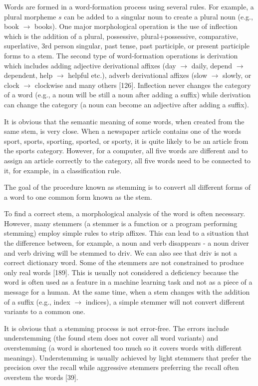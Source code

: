 \documentclass[11pt,openany,executivepaper]{book}
\begin{document}
Words are formed in a word-formation process using several rules. For example, a plural morpheme $s$ can be added to a singular noun to create a plural noun (e.g., book $\rightarrow$ books). One major morphological operation is the use of inflection which is the addition of a plural, possessive, plural+possessive, comparative, superlative, 3rd person singular, past tense, past participle, or present participle forms to a stem. The second type of word-formation operations is derivation which includes adding adjective derivational affixes (day $\rightarrow$ daily, depend $\rightarrow$ dependent, help $\rightarrow$ helpful etc.), adverb derivational affixes (slow $\rightarrow$ slowly, or clock $\rightarrow$ clockwise and many others [126]. Inflection never changes the category of a word (e.g., a noun will be still a noun after adding a suffix) while derivation can change the category (a noun can become an adjective after adding a suffix).

It is obvious that the semantic meaning of some words, when created from the same stem, is very close. When a newspaper article contains one of the words sport, sports, sporting, sported, or sporty, it is quite likely to be an article from the sports category. However, for a computer, all five words are different and to assign an article correctly to the category, all five words need to be connected to it, for example, in a classification rule.

The goal of the procedure known as stemming is to convert all different forms of a word to one common form known as the stem.

To find a correct stem, a morphological analysis of the word is often necessary. However, many stemmers (a stemmer is a function or a program performing stemming) employ simple rules to strip affixes. This can lead to a situation that the difference between, for example, a noun and verb disappears - a noun driver and verb driving will be stemmed to driv. We can also see that driv is not a correct dictionary word. Some of the stemmers are not constrained to produce only real words [189]. This is usually not considered a deficiency because the word is often used as a feature in a machine learning task and not as a piece of a message for a human. At the same time, when a stem changes with the addition of a suffix (e.g., index $\rightarrow$ indices), a simple stemmer will not convert different variants to a common one.

It is obvious that a stemming process is not error-free. The errors include understemming (the found stem does not cover all word variants) and overstemming (a word is shortened too much so it covers words with different meanings). Understemming is usually achieved by light stemmers that prefer the precision over the recall while aggressive stemmers preferring the recall often overstem the words [39].
\end{document}
